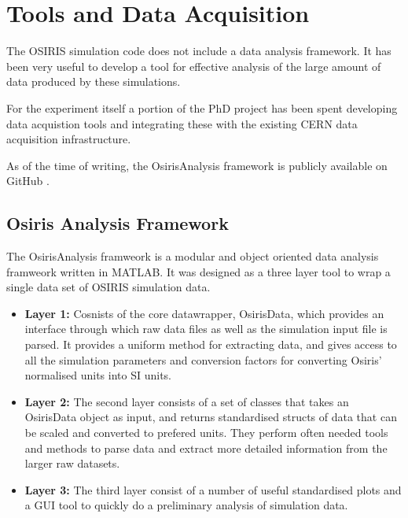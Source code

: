 %
%

\chapter{Tools and Data Acquisition}
\label{Ch:Tools}

The OSIRIS simulation code does not include a data analysis framework. It has been very useful to develop a tool for effective analysis of the large amount of data produced by these simulations.

For the experiment itself a portion of the PhD project has been spent developing data acquistion tools and integrating these with the existing CERN data acquisition infrastructure.

As of the time of writing, the OsirisAnalysis framework is publicly available on GitHub \cite{berglyd_olsen_osirisanalysis:_2013}.

\section{Osiris Analysis Framework}
\label{Tools:OA}

The OsirisAnalysis framweork is a modular and object oriented data analysis framweork written in MATLAB. It was designed as a three layer tool to wrap a single data set of OSIRIS simulation data.

\begin{itemize}
    \item \textbf{Layer 1:} Cosnists of the core datawrapper, OsirisData, which provides an interface through which raw data files as well as the simulation input file is parsed. It provides a uniform method for extracting data, and gives access to all the simulation parameters and conversion factors for converting Osiris' normalised units into SI units.
    \item \textbf{Layer 2:} The second layer consists of a set of classes that takes an OsirisData object as input, and returns standardised structs of data that can be scaled and converted to prefered units. They perform often needed tools and methods to parse data and extract more detailed information from the larger raw datasets.
    \item \textbf{Layer 3:} The third layer consist of a number of useful standardised plots and a GUI tool to quickly do a preliminary analysis of simulation data.
\end{itemize}

